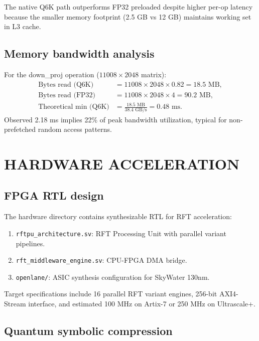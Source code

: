 \documentclass[aip,twocolumn,letterpaper]{revtex4}
\begin{document}
The native Q6K path outperforms FP32 preloaded despite higher per-op latency because the smaller memory footprint (2.5 GB vs 12 GB) maintains working set in L3 cache.

\subsection{Memory bandwidth analysis}

For the down\_proj operation (\(11008 \times 2048\) matrix):
\begin{align}
\text{Bytes read (Q6K)} &= 11008 \times 2048 \times 0.82 = 18.5\text{ MB}, \\
\text{Bytes read (FP32)} &= 11008 \times 2048 \times 4 = 90.2\text{ MB}, \\
\text{Theoretical min (Q6K)} &= \frac{18.5\text{ MB}}{38.4\text{ GB/s}} = 0.48\text{ ms}.
\end{align}
Observed 2.18 ms implies 22\% of peak bandwidth utilization, typical for non-prefetched random access patterns.

\section{HARDWARE ACCELERATION}

\subsection{FPGA RTL design}

The hardware directory contains synthesizable RTL for RFT acceleration:
\begin{enumerate}
\item \texttt{rftpu\_architecture.sv}: RFT Processing Unit with parallel variant pipelines.
\item \texttt{rft\_middleware\_engine.sv}: CPU-FPGA DMA bridge.
\item \texttt{openlane/}: ASIC synthesis configuration for SkyWater 130nm.
\end{enumerate}

Target specifications include 16 parallel RFT variant engines, 256-bit AXI4-Stream interface, and estimated 100 MHz on Artix-7 or 250 MHz on Ultrascale+.

\subsection{Quantum symbolic compression}
\end{document}
